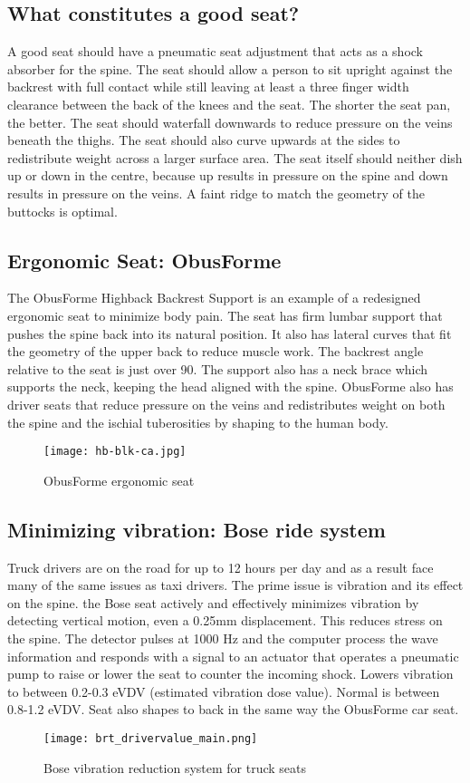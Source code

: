 \documentclass[11pt]{article}
\begin{document}
\subsection{What constitutes a good seat?}
A good seat should have a pneumatic seat adjustment that acts as a shock absorber for the spine. The seat 
should allow a person to sit upright against the backrest with full contact while still leaving at least a 
three finger width clearance between the back of the knees and the seat. The shorter the seat pan, the better. 
The seat should waterfall downwards to reduce pressure on the veins beneath the thighs. The seat should also curve 
upwards at the sides to redistribute weight across a larger surface area. The seat itself should neither dish 
up or down in the centre, because up results in pressure on the spine and down results in pressure on the veins. 
A faint ridge to match the geometry of the buttocks is optimal\cite{ergoCentricchair2011, Natpost2005}.


\subsection{Ergonomic Seat: ObusForme}
The ObusForme Highback Backrest Support is an example of a redesigned ergonomic seat to minimize body pain. 
The seat has firm lumbar support that pushes the spine back into its natural position. 
It also has lateral curves that fit the geometry of the upper back to reduce muscle work\cite{ObusFormebackrest}. 
The backrest angle relative to the seat is just over 90\textdegree. The support also has a neck brace which supports
the neck, keeping the head aligned with the spine\cite{ObusFormedriverchair}.
ObusForme also has driver seats that reduce pressure on the veins and redistributes weight 
on both the spine and the ischial tuberosities by shaping to the human body\cite{ObusFormecushion}.
\begin{figure}[h]
  \centering
  \texttt{[image: hb-blk-ca.jpg]}
  \caption{ObusForme ergonomic seat}
\end{figure}
\subsection{Minimizing vibration: Bose ride system}
Truck drivers are on the road for up to 12 hours per day and as a result face many of the same issues as taxi drivers. 
The prime issue is vibration and its effect on the spine. the Bose seat actively and effectively minimizes vibration 
by detecting vertical motion, even a 0.25mm displacement. This reduces stress on the spine. 
The detector pulses at 1000 Hz and the computer process the 
wave information and responds with a signal to an actuator that operates a pneumatic pump to raise or lower the seat to 
counter the incoming shock. Lowers vibration to between 0.2-0.3 eVDV (estimated vibration dose value). Normal is 
between 0.8-1.2 eVDV\cite{Bosetruckseat}. Seat also shapes to back in the same way the 
ObusForme car seat\cite{Bosetruckseat}.
\begin{figure}[h]
  \centering
  \texttt{[image: brt\_drivervalue\_main.png]}
  \caption{Bose vibration reduction system for truck seats}
\end{figure}
\end{document}
